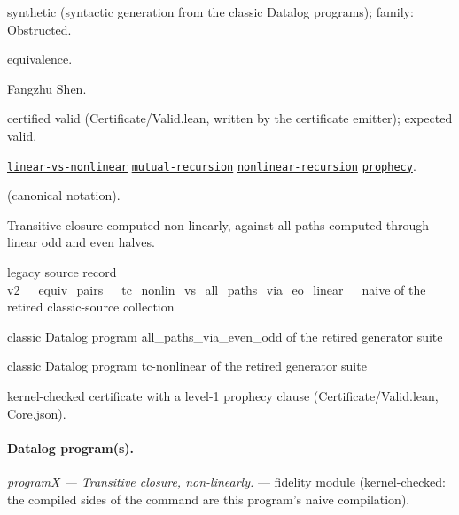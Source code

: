 \documentclass[10pt]{article}
\begin{document}
\begin{description}[leftmargin=2.6cm,style=nextline,itemsep=1pt]

\item[Category] synthetic (syntactic generation from the classic Datalog programs); family: Obstructed.

\item[Kind] equivalence.

\item[Contributors] Fangzhu Shen.

\item[Status] certified valid (Certificate/Valid.lean, written by the certificate emitter); expected valid.

\item[Tags] \hyperref[tag:linear-vs-nonlinear]{\texttt{linear-vs-nonlinear}} \hyperref[tag:mutual-recursion]{\texttt{mutual-recursion}} \hyperref[tag:nonlinear-recursion]{\texttt{nonlinear-recursion}} \hyperref[tag:prophecy]{\texttt{prophecy}}.

\item[Input]  (canonical notation).

\item[Summary] Transitive closure computed non-linearly, against all paths computed through linear odd and even halves.

\item[Sources] {\raggedright legacy source record v2\_\_equiv\_pairs\_\_tc\_nonlin\_vs\_all\_paths\_via\_eo\_linear\_\_naive of the retired classic-source collection \par classic Datalog program all\_paths\_via\_even\_odd of the retired generator suite \par classic Datalog program tc-nonlinear of the retired generator suite\par}

\item[Prophecy] kernel-checked certificate with a level-1 prophecy clause (Certificate/Valid.lean, Core.json).

\end{description}

\paragraph{Datalog program(s).}

{\raggedright\textit{programX --- Transitive closure, non-linearly.} --- fidelity module (kernel-checked: the compiled sides of the command are this program's naive compilation).\par}
\end{document}
